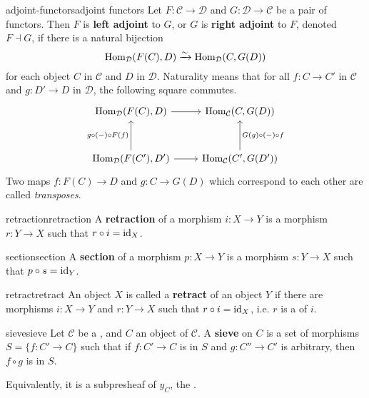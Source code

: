\begin{topic}{adjoint-functors}{adjoint functors}
    Let $F : \mathcal{C} \to \mathcal{D}$ and $G : \mathcal{D} \to \mathcal{C}$ be a pair of functors. Then $F$ is \textbf{left adjoint} to $G$, or $G$ is \textbf{right adjoint} to $F$, denoted $F \dashv G$, if there is a natural bijection
    \[ \text{Hom}_{\mathcal{D}}(F(C), D) \xrightarrow{\sim} \text{Hom}_{\mathcal{D}}(C, G(D)) \]
    for each object $C$ in $\mathcal{C}$ and $D$ in $\mathcal{D}$. Naturality means that for all $f : C \to C'$ in $\mathcal{C}$ and $g : D' \to D$ in $\mathcal{D}$, the following square commutes.
    \[ \begin{tikzcd}[row sep=3em] \Hom_{\mathcal{D}}(F(C), D) \arrow{r} & \Hom_{\mathcal{C}}(C, G(D)) \\ \Hom_{\mathcal{D}}(F(C'), D') \arrow{r} \arrow{u}{g \circ (-) \circ F(f)} & \Hom_{\mathcal{C}}(C', G(D')) \arrow[swap]{u}{G(g) \circ (-) \circ f} \end{tikzcd} \]
    Two maps $f : F(C) \to D$ and $g : C \to G(D)$ which correspond to each other are called \textit{transposes}.
\end{topic}

\begin{topic}{retraction}{retraction}
    A \textbf{retraction} of a morphism $i : X \to Y$ is a morphism $r : Y \to X$ such that $r \circ i = \text{id}_X$.
\end{topic}

\begin{topic}{section}{section}
    A \textbf{section} of a morphism $p : X \to Y$ is a morphism $s : Y \to X$ such that $p \circ s = \text{id}_Y$.
\end{topic}

\begin{topic}{retract}{retract}
    An object $X$ is called a \textbf{retract} of an object $Y$ if there are morphisms $i : X \to Y$ and $r : Y \to X$ such that $r \circ i = \text{id}_X$, i.e. $r$ is a  of $i$.
\end{topic}

\begin{topic}{sieve}{sieve}
    Let $\mathcal{C}$ be a , and $C$ an object of $\mathcal{C}$. A \textbf{sieve} on $C$ is a set of morphisms $S = \{ f : C' \to C \}$ such that if $f : C' \to C$ is in $S$ and $g : C'' \to C'$ is arbitrary, then $f \circ g$ is in $S$.
    
    Equivalently, it is a subpresheaf of $y_C$, the .
\end{topic}

